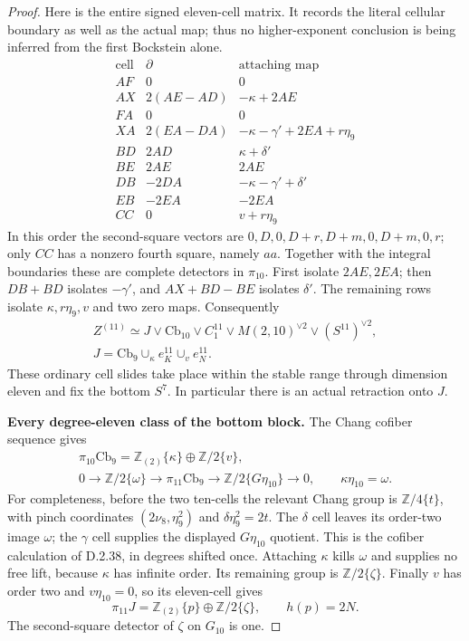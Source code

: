 \begin{proof}
Here is the entire signed eleven-cell matrix.  It records
the literal cellular boundary as well as the actual map;
thus no higher-exponent conclusion is being inferred from
the first Bockstein alone.
\[
\begin{array}{c|c|c}
\text{cell}&\partial&\text{attaching map}\\ \hline
AF&0&0\\
AX&2(AE-AD)&-\kappa+2AE\\
FA&0&0\\
XA&2(EA-DA)&-\kappa-\gamma'+2EA+r\eta_9\\
BD&2AD&\kappa+\delta'\\
BE&2AE&2AE\\
DB&-2DA&-\kappa-\gamma'+\delta'\\
EB&-2EA&-2EA\\
CC&0&v+r\eta_9
\end{array}
\tag{D.2.60k}
\]
In this order the second-square vectors are
$0,D,0,D+r,D+m,0,D+m,0,r$; only $CC$ has a nonzero
fourth square, namely $aa$.  Together with the integral
boundaries these are complete detectors in $\pi_{10}$.
First isolate $2AE,2EA$; then $DB+BD$ isolates $-\gamma'$,
and $AX+BD-BE$ isolates $\delta'$.  The remaining rows
isolate $\kappa,r\eta_9,v$ and two zero maps.  Consequently
\[
\begin{gathered}
 Z^{(11)}\simeq J\vee\mathrm{Cb}_{10}\vee C_1^{11}
                 \vee M(2,10)^{\vee2}\vee(S^{11})^{\vee2},\\
 J=\mathrm{Cb}_9\cup_\kappa e^{11}_K\cup_v e^{11}_N.
\end{gathered}
\tag{D.2.60l}
\]
These ordinary cell slides take place within the stable
range through dimension eleven and fix the bottom $S^7$.
In particular there is an actual retraction onto $J$.

\textbf{Every degree-eleven class of the bottom block.}
The Chang cofiber sequence gives
\[
\begin{gathered}
 \pi_{10}\mathrm{Cb}_9=\mathbb Z_{(2)}\{\kappa\}
                                  \oplus\mathbb Z/2\{v\},\\
 0\longrightarrow\mathbb Z/2\{\omega\}
 \longrightarrow\pi_{11}\mathrm{Cb}_9
 \longrightarrow\mathbb Z/2\{G\eta_{10}\}\longrightarrow0,
 \qquad\kappa\eta_{10}=\omega.
\end{gathered}
\tag{D.2.60m}
\]
For completeness, before the two ten-cells the relevant
Chang group is $\mathbb Z/4\{t\}$, with pinch coordinates
$(2\nu_8,\eta_9^2)$ and $\delta\eta_9^2=2t$.
The $\delta$ cell leaves its order-two image $\omega$;
the $\gamma$ cell supplies the displayed $G\eta_{10}$
quotient.  This is the cofiber calculation of D.2.38,
in degrees shifted once.  Attaching $\kappa$ kills
$\omega$ and supplies no free lift, because $\kappa$ has
infinite order.  Its remaining group is
$\mathbb Z/2\{\zeta\}$.  Finally $v$ has order two
and $v\eta_{10}=0$, so its eleven-cell gives
\[
 \pi_{11}J=\mathbb Z_{(2)}\{p\}\oplus\mathbb Z/2\{\zeta\},
 \qquad h(p)=2N.
 \tag{D.2.60n}
\]
The second-square detector of $\zeta$ on $G_{10}$ is one.


\end{proof}
